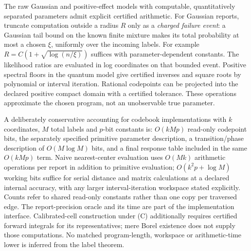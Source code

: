 The raw Gaussian and positive-effect models with computable, quantitatively separated parameters admit explicit certified arithmetic. For Gaussian reports, truncate computation outside a radius $R$ only as a \emph{charged failure event}: a Gaussian tail bound on the known finite mixture makes its total probability at most a chosen $\xi$, uniformly over the incoming labels. For example $R=C(1+\sqrt{\log(n/\xi)})$ suffices with parameter-dependent constants. The likelihood ratios are evaluated in log coordinates on that bounded event. Positive spectral floors in the quantum model give certified inverses and square roots by polynomial or interval iteration. Rational codepoints can be projected into the declared positive compact domain with a certified tolerance. These operations approximate the chosen program, not an unobservable true parameter.

A deliberately conservative accounting for codebook implementations with $k$ coordinates, $M$ total labels and $p$-bit constants is: $O(kMp)$ read-only codepoint bits, the separately specified primitive parameter description, a transition/phase description of $O(M\log M)$ bits, and a final response table included in the same $O(kMp)$ term. Naive nearest-center evaluation uses $O(Mk)$ arithmetic operations per report in addition to primitive evaluation; $O(k^2p+\log M)$ working bits suffice for serial distance and matrix calculations at a declared internal accuracy, with any larger interval-iteration workspace stated explicitly. Counts refer to shared read-only constants rather than one copy per traversed edge. The report-precision oracle and its time are part of the implementation interface. Calibrated-cell construction under (C) additionally requires certified forward integrals for its representatives; mere Borel existence does not supply those computations. No matched program-length, workspace or arithmetic-time lower is inferred from the label theorem.

